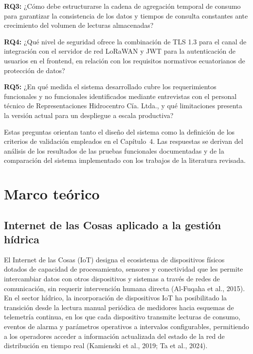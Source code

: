 \documentclass[12pt,a4paper,oneside]{report}
\begin{document}
\textbf{RQ3:} ¿Cómo debe estructurarse la cadena de agregación temporal de consumo para garantizar la consistencia de los datos y tiempos de consulta constantes ante crecimiento del volumen de lecturas almacenadas?

\textbf{RQ4:} ¿Qué nivel de seguridad ofrece la combinación de TLS 1.3 para el canal de integración con el servidor de red LoRaWAN y JWT para la autenticación de usuarios en el frontend, en relación con los requisitos normativos ecuatorianos de protección de datos?

\textbf{RQ5:} ¿En qué medida el sistema desarrollado cubre los requerimientos funcionales y no funcionales identificados mediante entrevistas con el personal técnico de Representaciones Hidrocentro Cía. Ltda., y qué limitaciones presenta la versión actual para un despliegue a escala productiva?

Estas preguntas orientan tanto el diseño del sistema como la definición de los criterios de validación empleados en el Capítulo~4. Las respuestas se derivan del análisis de los resultados de las pruebas funcionales documentadas y de la comparación del sistema implementado con los trabajos de la literatura revisada.

\section{Marco teórico}\label{marco-teuxf3rico}

\subsection{Internet de las Cosas aplicado a la gestión hídrica}\label{internet-de-las-cosas-aplicado-a-la-gestiuxf3n-huxeddrica}

El Internet de las Cosas (IoT) designa el ecosistema de dispositivos físicos dotados de capacidad de procesamiento, sensores y conectividad que les permite intercambiar datos con otros dispositivos y sistemas a través de redes de comunicación, sin requerir intervención humana directa (Al-Fuqaha et al., 2015). En el sector hídrico, la incorporación de dispositivos IoT ha posibilitado la transición desde la lectura manual periódica de medidores hacia esquemas de telemetría continua, en los que cada dispositivo transmite lecturas de consumo, eventos de alarma y parámetros operativos a intervalos configurables, permitiendo a los operadores acceder a información actualizada del estado de la red de distribución en tiempo real (Kamienski et al., 2019; Ta et al., 2024).
\end{document}
